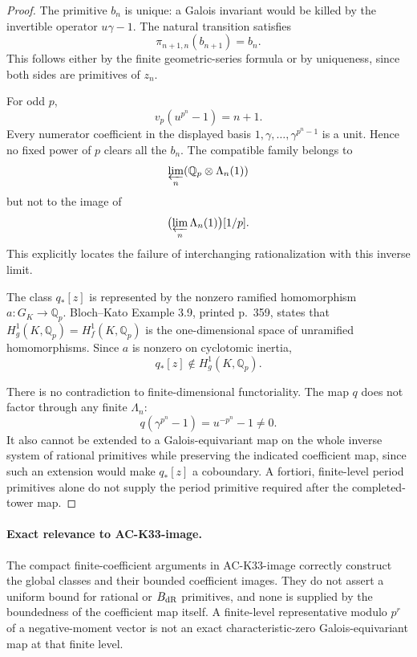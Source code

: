 \begin{proof}
The primitive \(b_n\) is unique: a Galois invariant would be killed
by the invertible operator \(u\gamma-1\).
The natural transition satisfies
\[
                 \pi_{n+1,n}(b_{n+1})=b_n .
\]
This follows either by the finite geometric-series formula or by
uniqueness, since both sides are primitives of \(z_n\).

For odd \(p\),
\[
                      v_p(u^{p^n}-1)=n+1.
\]
Every numerator coefficient in the displayed basis
\(1,\gamma,\ldots,\gamma^{p^n-1}\) is a unit.
Hence no fixed power of \(p\) clears all the \(b_n\).
The compatible family belongs to
\[
 \varprojlim_n(\mathbb Q_p\otimes\Lambda_n(1))
\]
but not to the image of
\[
          \bigl(\varprojlim_n\Lambda_n(1)\bigr)[1/p].
\]
This explicitly locates the failure of interchanging rationalization
with this inverse limit.

The class \(q_*[z]\) is represented by the nonzero ramified homomorphism
\(a:G_K\to\mathbb Q_p\).
Bloch--Kato Example 3.9, printed p.~359, states that
\(H_g^1(K,\mathbb Q_p)=H_f^1(K,\mathbb Q_p)\) is the one-dimensional
space of unramified homomorphisms.
Since \(a\) is nonzero on cyclotomic inertia,
\[
                         q_*[z]\notin H_g^1(K,\mathbb Q_p).
\]

There is no contradiction to finite-dimensional functoriality.
The map \(q\) does not factor through any finite \(\Lambda_n\):
\[
 q(\gamma^{p^n}-1)=u^{-p^n}-1\ne0.
\]
It also cannot be extended to a Galois-equivariant map on the whole
inverse system of rational primitives while preserving the indicated
coefficient map, since such an extension would make \(q_*[z]\) a
coboundary.  A fortiori, finite-level period primitives alone do not
supply the period primitive required after the completed-tower map.
\end{proof}

\paragraph{Exact relevance to AC-K33-image.}
The compact finite-coefficient arguments in AC-K33-image correctly
construct the global classes and their bounded coefficient images.
They do not assert a uniform bound for rational or \(B_{\rm dR}\)
primitives, and none is supplied by the boundedness of the coefficient
map itself.  A finite-level representative modulo \(p^r\) of a
negative-moment vector is not an exact characteristic-zero
Galois-equivariant map at that finite level.

